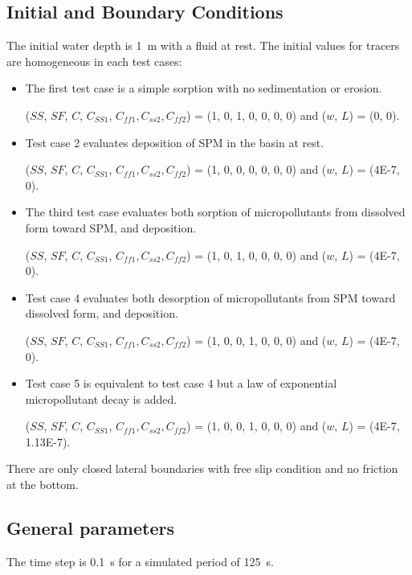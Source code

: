 \subsection{Initial and Boundary Conditions}
The initial water depth is 1~m with a fluid at rest.
The initial values for tracers are homogeneous in each test cases:\\
\begin{itemize}
  \item
    The first test case is a simple sorption with no sedimentation or erosion.

    ($SS$, $SF$, $C$, $C_{SS1}$, $C_{ff1},C_{ss2},C_{ff2}$) = (1, 0, 1, 0, 0, 0, 0) and ($w$, $L$) = (0, 0).\\
  \item
    Test case 2 evaluates deposition of SPM in the basin at rest.

($SS$, $SF$, $C$, $C_{SS1}$, $C_{ff1},C_{ss2},C_{ff2}$) = (1, 0, 0, 0, 0, 0, 0) and ($w$, $L$) = (4E-7, 0).\\
\item
  The third test case evaluates both sorption of micropollutants from
  dissolved form toward SPM, and deposition.

($SS$, $SF$, $C$, $C_{SS1}$, $C_{ff1},C_{ss2},C_{ff2}$) = (1, 0, 1, 0, 0, 0, 0) and ($w$, $L$) = (4E-7, 0).\\
  \item
    Test case 4 evaluates both desorption of micropollutants from SPM
    toward dissolved form, and deposition.

 ($SS$, $SF$, $C$, $C_{SS1}$, $C_{ff1},C_{ss2},C_{ff2}$) = (1, 0, 0, 1, 0, 0, 0) and ($w$, $L$) = (4E-7, 0).\\
  \item
    Test case 5 is equivalent to test case 4 but a law of exponential
    micropollutant decay is added.

($SS$, $SF$, $C$, $C_{SS1}$, $C_{ff1},C_{ss2},C_{ff2}$) = (1, 0, 0, 1, 0, 0, 0) and ($w$, $L$) = (4E-7, 1.13E-7).\\
\end{itemize}

There are only closed lateral boundaries with free slip condition
and no friction at the bottom.

\subsection{General parameters}

The time step is 0.1~s for a simulated period of 125~s.

